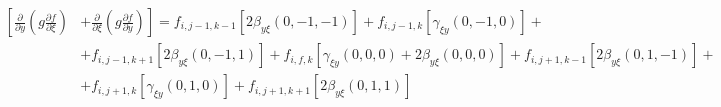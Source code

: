\begin{equation*}
    \begin{split}
        \left[
            \frac
                {\partial}
                {\partial y}
            \left(
                g
                \frac
                    {\partial f}
                    {\partial \xi}
            \right)
        \right.&
        \left.
            +
            \frac
                {\partial}
                {\partial \xi}
            \left(
                g
                \frac
                    {\partial f}
                    {\partial y}
            \right)
        \right]
        =
        f_{i, j-1, k-1}
        \left[
            2
            \beta_{y\xi} \left(0, -1, -1\right)
        \right]
        +
        f_{i, j-1, k}
        \left[
            \gamma_{\xi y} \left(0, -1, 0\right)
        \right]
        +
        \\
        &
        +
        f_{i, j-1, k+1}
        \left[
            2
            \beta_{y\xi} \left(0, -1, 1\right)
        \right]
        +
        f_{i, f, k}
        \left[
            \gamma_{\xi y} \left(0, 0, 0\right)
            +
            2
            \beta_{y\xi} \left(0, 0, 0\right)
        \right]
        +
        f_{i, j+1, k-1}
        \left[
            2
            \beta_{y\xi} \left(0, 1, -1\right)
        \right]
        +
        \\
        &
        +
        f_{i, j+1, k}
        \left[
            \gamma_{\xi y} \left(0, 1, 0\right)
        \right]
        +
        f_{i, j+1, k+1}
        \left[
            2
            \beta_{y\xi} \left(0, 1, 1\right)
        \right]
    \end{split}
\end{equation*}